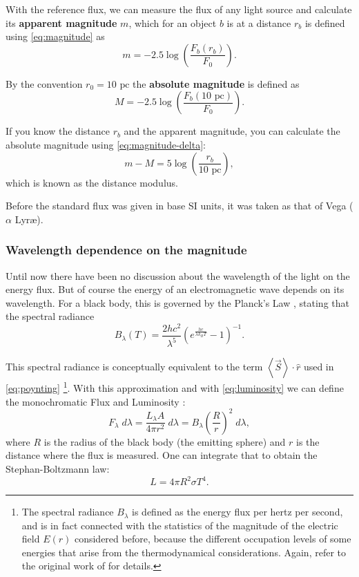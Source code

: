 	With the reference flux, we can measure the flux of any light source and calculate its \textbf{apparent magnitude} $m$,
	which for an object $b$ is at a distance $r_b$ is defined using \autoref{eq:magnitude} as
	\begin{equation}
		m = -2.5 \log\left(\frac{F_b(r_b)}{F_0}\right).
	\end{equation}
	
	By the convention $r_0=10\text{ pc}$ the \textbf{absolute magnitude} is defined as
	\begin{equation}
		M = -2.5 \log\left(\frac{F_b(10\text{ pc})}{F_0}\right).
	\end{equation}
	
	If you know the distance $r_b$ and the apparent magnitude, you can calculate the absolute magnitude using \autoref{eq:magnitude-delta}:
	\begin{equation}
		m-M = 5 \log\left(\frac{r_b}{10 \text{ pc}}\right), \label{eq:distance-modulus}
	\end{equation}
	which is known as the distance modulus.
	
	Before the standard flux was given in base SI units, it was taken as that of Vega ($\alpha$ Lyr\ae{}).
	
	\subsubsection{Wavelength dependence on the magnitude}
	
	Until now there have been no discussion about the wavelength of the light on the energy flux. 
	But of course the energy of an electromagnetic wave depends on its wavelength. 
	For a black body, this is governed by the Planck's Law \citep{Planck1901}, stating that the spectral radiance
	\begin{equation}
		B_\lambda(T) = \frac{2hc^2}{\lambda^5}\left(e^{\frac{hc}{\lambda k_B T}}-1\right)^{-1}.
	\end{equation}
	
	This spectral radiance is conceptually equivalent to the term $\left<\vec S\right>\cdot \hat r$ used in \autoref{eq:poynting} \footnote{
		The spectral radiance $B_\lambda$ is defined as the energy flux per hertz per second,
		and is in fact connected with the statistics of the magnitude of the electric field $E(r)$ considered before, 
		because the different occupation levels of some energies that arise from  the thermodynamical considerations.
		Again, refer to the original work of \cite{Planck1901}  for details.
	}. 
	With this approximation and with \autoref{eq:luminosity} we can define the monochromatic Flux and Luminosity \citep[Chapter~3, Section~5]{Carroll2017}:
	\begin{equation}
		F_\lambda \;d\lambda = \frac{L_\lambda A}{4\pi r^2} \;d\lambda = B_\lambda\left(\frac{R}{r}\right)^2 \;d\lambda,
	\end{equation}
	where $R$ is the radius of the black body (the emitting sphere) and $r$ is the distance where the flux is measured.
	One can integrate that to obtain the Stephan-Boltzmann law:
	\begin{equation}
		L = 4\pi R^2 \sigma T^4.
	\end{equation}
	

